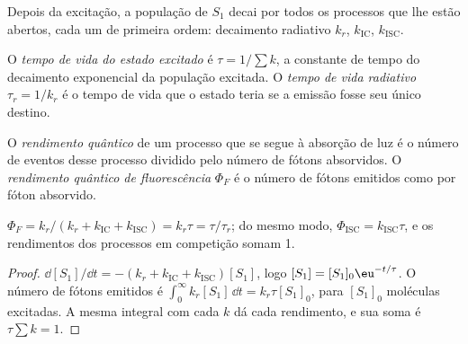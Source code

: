 Depois da excitação, a população de $S_1$ decai por todos os processos que lhe
estão abertos, cada um de primeira ordem: decaimento radiativo $k_r$,  $k_{\mathrm{IC}}$,  $k_{\mathrm{ISC}}$.

\begin{definition}\label{def:b3:electronic-spectroscopy:lifetime}
O \emph{tempo de vida do estado excitado} é $\tau =
1/\sum k$, a constante de tempo do decaimento exponencial da população
excitada. O \emph{tempo de vida radiativo} $\tau_r =
1/k_r$ é o tempo de vida que o estado teria se a emissão fosse seu único
destino.
\end{definition}

\begin{definition}\label{def:b3:electronic-spectroscopy:quantum-yield}
O \emph{rendimento quântico} de um processo que se segue à
absorção de luz é o número de eventos desse processo dividido pelo número de
fótons absorvidos. O \emph{rendimento quântico de
fluorescência} $\Phi_F$ é o número de fótons
emitidos como  por fóton absorvido.
\end{definition}

\begin{proposition}\label{prop:b3:electronic-spectroscopy:quantum-yield}
$\Phi_F = k_r/(k_r + k_{\mathrm{IC}} + k_{\mathrm{ISC}}) = k_r\tau = \tau/\tau_r$; do mesmo modo,
$\Phi_{\mathrm{ISC}} = k_{\mathrm{ISC}}\tau$, e os rendimentos dos processos em competição somam
1.
\end{proposition}

\begin{proof}
$\dd[S_1]/\dd t = -(k_r + k_{\mathrm{IC}} + k_{\mathrm{ISC}})[S_1]$, logo $[S_1] = [S_1]_0\eu^{-t/\tau}$.
O número de fótons emitidos é $\int_0^\infty k_r[S_1]\,\dd t = k_r\tau[S_1]_0$, para
$[S_1]_0$ moléculas excitadas. A mesma integral com cada $k$ dá cada rendimento,
e sua soma é $\tau\sum k = 1$.
\end{proof}

